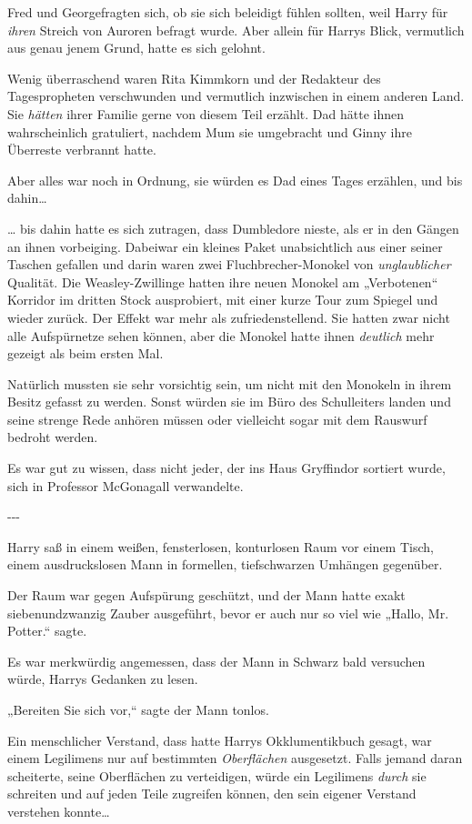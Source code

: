{Fred und Georgefragten sich, ob sie sich beleidigt fühlen sollten, weil Harry für \emph{ihren} Streich von Auroren befragt wurde. Aber allein für Harrys Blick, vermutlich aus genau jenem Grund, hatte es sich gelohnt.

Wenig überraschend waren Rita Kimmkorn und der Redakteur des Tagespropheten verschwunden und vermutlich inzwischen in einem anderen Land. Sie \emph{hätten} ihrer Familie gerne von diesem Teil erzählt. Dad hätte ihnen wahrscheinlich gratuliert, nachdem Mum sie umgebracht und Ginny ihre Überreste verbrannt hatte.

Aber alles war noch in Ordnung, sie würden es Dad eines Tages erzählen, und bis dahin…

… bis dahin hatte es sich zutragen, dass Dumbledore nieste, als er in den Gängen an ihnen vorbeiging. Dabeiwar ein kleines Paket unabsichtlich aus einer seiner Taschen gefallen und darin waren zwei Fluchbrecher-Monokel von \emph{unglaublicher} Qualität. Die Weasley-Zwillinge hatten ihre neuen Monokel am „Verbotenen“ Korridor im dritten Stock ausprobiert, mit einer kurze Tour zum Spiegel und wieder zurück. Der Effekt war mehr als zufriedenstellend. Sie hatten zwar nicht alle Aufspürnetze sehen können, aber die Monokel hatte ihnen \emph{deutlich} mehr gezeigt als beim ersten Mal.

Natürlich mussten sie sehr vorsichtig sein, um nicht mit den Monokeln in ihrem Besitz gefasst zu werden. Sonst würden sie im Büro des Schulleiters landen und seine strenge Rede anhören müssen oder vielleicht sogar mit dem Rauswurf bedroht werden.

Es war gut zu wissen, dass nicht jeder, der ins Haus Gryffindor sortiert wurde, sich in Professor McGonagall verwandelte.

-\/-\/-

Harry saß in einem weißen, fensterlosen, konturlosen Raum vor einem Tisch, einem ausdruckslosen Mann in formellen, tiefschwarzen Umhängen gegenüber.

Der Raum war gegen Aufspürung geschützt, und der Mann hatte exakt siebenundzwanzig Zauber ausgeführt, bevor er auch nur so viel wie „Hallo, Mr. Potter.“ sagte.

Es war merkwürdig angemessen, dass der Mann in Schwarz bald versuchen würde, Harrys Gedanken zu lesen.

„Bereiten Sie sich vor,“ sagte der Mann tonlos.

Ein menschlicher Verstand, dass hatte Harrys Okklumentikbuch gesagt, war einem Legilimens nur auf bestimmten \emph{Oberflächen} ausgesetzt. Falls jemand daran scheiterte, seine Oberflächen zu verteidigen, würde ein Legilimens \emph{durch} sie schreiten und auf jeden Teile zugreifen können, den sein eigener Verstand verstehen konnte…

}
